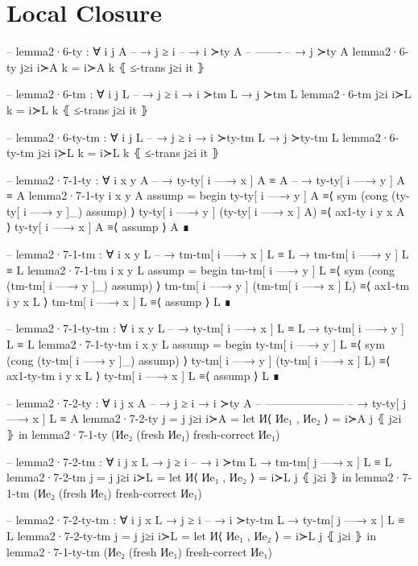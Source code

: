 \documentclass[logo,bsc,singlespacing,parskip,online]{infthesis}
\begin{document}
\section{Local Closure}
\label{appendix:f_local_closure}
\begin{code}
  -- lemma2·6-ty : ∀ {i j A}
  --   → j ≥ i
  --   → i ≻ty A
  --     -------
  --   → j ≻ty A
  lemma2·6-ty j≥i i≻A k =
    i≻A k ⦃ ≤-trans j≥i it ⦄

  -- lemma2·6-tm : ∀ {i j L}
  --   → j ≥ i → i ≻tm L → j ≻tm L
  lemma2·6-tm j≥i i≻L k =
    i≻L k ⦃ ≤-trans j≥i it ⦄

  -- lemma2·6-ty-tm : ∀ {i j L}
  --   → j ≥ i → i ≻ty-tm L → j ≻ty-tm L
  lemma2·6-ty-tm j≥i i≻L k =
    i≻L k ⦃ ≤-trans j≥i it ⦄

  -- lemma2·7-1-ty : ∀ {i x y A}
  --   → ty-ty[ i —→ x ] A ≡ A
  --   → ty-ty[ i —→ y ] A ≡ A
  lemma2·7-1-ty {i} {x} {y} {A} assump =
    begin
      ty-ty[ i —→ y ] A
    ≡⟨ sym (cong (ty-ty[ i —→ y ]_) assump) ⟩
      ty-ty[ i —→ y ] (ty-ty[ i —→ x ] A)
    ≡⟨ ax1-ty i y x A ⟩
      ty-ty[ i —→ x ] A
    ≡⟨ assump ⟩
      A
    ∎

  -- lemma2·7-1-tm : ∀ {i x y L}
  --   → tm-tm[ i —→ x ] L ≡ L → tm-tm[ i —→ y ] L ≡ L
  lemma2·7-1-tm {i} {x} {y} {L} assump =
    begin
      tm-tm[ i —→ y ] L
    ≡⟨ sym (cong (tm-tm[ i —→ y ]_) assump) ⟩
      tm-tm[ i —→ y ] (tm-tm[ i —→ x ] L)
    ≡⟨ ax1-tm i y x L ⟩
      tm-tm[ i —→ x ] L
    ≡⟨ assump ⟩
      L
    ∎

  -- lemma2·7-1-ty-tm : ∀ {i x y L}
  --   → ty-tm[ i —→ x ] L ≡ L → ty-tm[ i —→ y ] L ≡ L
  lemma2·7-1-ty-tm {i} {x} {y} {L} assump =
    begin
      ty-tm[ i —→ y ] L
    ≡⟨ sym (cong (ty-tm[ i —→ y ]_) assump) ⟩
      ty-tm[ i —→ y ] (ty-tm[ i —→ x ] L)
    ≡⟨ ax1-ty-tm i y x L ⟩
      ty-tm[ i —→ x ] L
    ≡⟨ assump ⟩
      L
    ∎

  -- lemma2·7-2-ty : ∀ {i j x A}
  --   → j ≥ i       → i ≻ty A
  --     ---------------------
  --   → ty-ty[ j —→ x ] L ≡ A
  lemma2·7-2-ty {j = j} j≥i i≻A =
    let И⟨ Иe₁ , Иe₂ ⟩ = i≻A j ⦃ j≥i ⦄ in
      lemma2·7-1-ty (Иe₂ (fresh Иe₁) {fresh-correct Иe₁})

  -- lemma2·7-2-tm : ∀ {i j x L} → j ≥ i
  --   → i ≻tm L → tm-tm[ j —→ x ] L ≡ L
  lemma2·7-2-tm {j = j} j≥i i≻L =
    let И⟨ Иe₁ , Иe₂ ⟩ = i≻L j ⦃ j≥i ⦄ in
      lemma2·7-1-tm (Иe₂ (fresh Иe₁) {fresh-correct Иe₁})

  -- lemma2·7-2-ty-tm : ∀ {i j x L} → j ≥ i
  --   → i ≻ty-tm L → ty-tm[ j —→ x ] L ≡ L
  lemma2·7-2-ty-tm {j = j} j≥i i≻L =
    let И⟨ Иe₁ , Иe₂ ⟩ = i≻L j ⦃ j≥i ⦄ in
      lemma2·7-1-ty-tm (Иe₂ (fresh Иe₁) {fresh-correct Иe₁})
\end{code}
\end{document}
